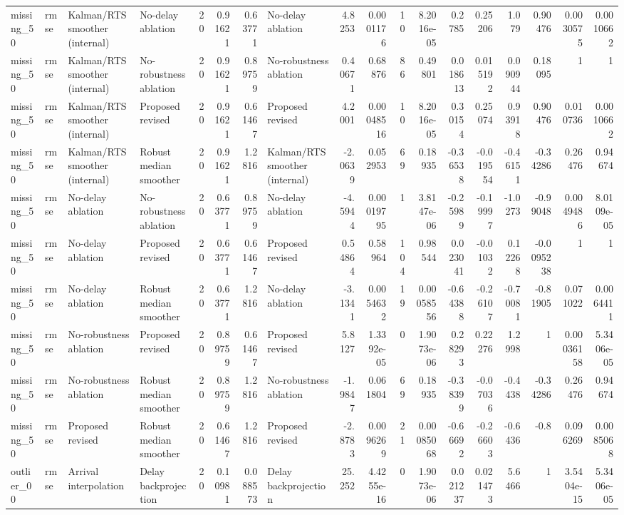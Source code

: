 \begin{table}[!htbp]
{\begin{tabular}{llllrrrlrrrrrrrrrr}
missing_50 & rmse & Kalman/RTS smoother (internal) & No-delay ablation & 20 & 0.91621 & 0.63771 & No-delay ablation & 4.8253 & 0.0001176 & 10 & 8.2016e-05 & 0.2785 & 0.25206 & 1.079 & 0.90476 & 0.0030575 & 0.0010662 \\
missing_50 & rmse & Kalman/RTS smoother (internal) & No-robustness ablation & 20 & 0.91621 & 0.89759 & No-robustness ablation & 0.40671 & 0.68876 & 86 & 0.49801 & 0.018613 & 0.015192 & 0.090944 & 0.18095 & 1 & 1 \\
missing_50 & rmse & Kalman/RTS smoother (internal) & Proposed revised & 20 & 0.91621 & 0.61467 & Proposed revised & 4.2001 & 0.00048516 & 10 & 8.2016e-05 & 0.30154 & 0.25074 & 0.93918 & 0.90476 & 0.010736 & 0.0010662 \\
missing_50 & rmse & Kalman/RTS smoother (internal) & Robust median smoother & 20 & 0.91621 & 1.2816 & Kalman/RTS smoother (internal) & -2.0639 & 0.052953 & 69 & 0.18935 & -0.36538 & -0.019554 & -0.46151 & -0.34286 & 0.26476 & 0.94674 \\
missing_50 & rmse & No-delay ablation & No-robustness ablation & 20 & 0.63771 & 0.89759 & No-delay ablation & -4.5944 & 0.00019795 & 1 & 3.8147e-06 & -0.25989 & -0.19997 & -1.0273 & -0.99048 & 0.0049486 & 8.0109e-05 \\
missing_50 & rmse & No-delay ablation & Proposed revised & 20 & 0.63771 & 0.61467 & Proposed revised & 0.54864 & 0.58964 & 104 & 0.98544 & 0.023041 & -0.01032 & 0.12268 & -0.0095238 & 1 & 1 \\
missing_50 & rmse & No-delay ablation & Robust median smoother & 20 & 0.63771 & 1.2816 & No-delay ablation & -3.1341 & 0.0054632 & 19 & 0.00058556 & -0.64388 & -0.26107 & -0.70081 & -0.81905 & 0.071022 & 0.0064411 \\
missing_50 & rmse & No-robustness ablation & Proposed revised & 20 & 0.89759 & 0.61467 & Proposed revised & 5.8127 & 1.3392e-05 & 0 & 1.9073e-06 & 0.28293 & 0.22276 & 1.2998 & 1 & 0.00036158 & 5.3406e-05 \\
missing_50 & rmse & No-robustness ablation & Robust median smoother & 20 & 0.89759 & 1.2816 & No-robustness ablation & -1.9847 & 0.061804 & 69 & 0.18935 & -0.38399 & -0.07036 & -0.4438 & -0.34286 & 0.26476 & 0.94674 \\
missing_50 & rmse & Proposed revised & Robust median smoother & 20 & 0.61467 & 1.2816 & Proposed revised & -2.8783 & 0.0096269 & 21 & 0.00085068 & -0.66692 & -0.26603 & -0.6436 & -0.8 & 0.096269 & 0.0085068 \\
outlier_00 & rmse & Arrival interpolation & Delay backprojection & 20 & 0.10981 & 0.088573 & Delay backprojection & 25.252 & 4.4255e-16 & 0 & 1.9073e-06 & 0.021237 & 0.021473 & 5.6466 & 1 & 3.5404e-15 & 5.3406e-05 \\

\end{tabular}}
\end{table}
